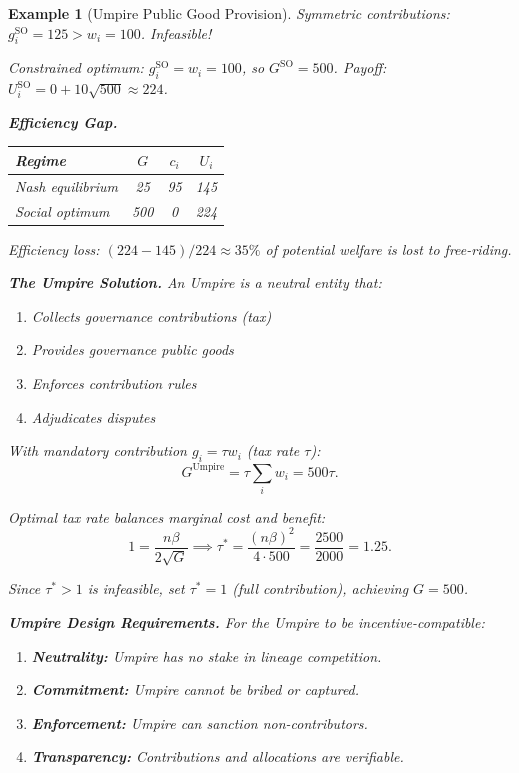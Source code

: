 \documentclass[12pt]{article}
\newtheorem{example}[theorem]{Example}
\begin{document}
\begin{example}[Umpire Public Good Provision]
Symmetric contributions: $g_i^{\text{SO}} = 125 > w_i = 100$. Infeasible!

Constrained optimum: $g_i^{\text{SO}} = w_i = 100$, so $G^{\text{SO}} = 500$.
Payoff: $U_i^{\text{SO}} = 0 + 10\sqrt{500} \approx 224$.

\textbf{Efficiency Gap.}
\begin{center}
\begin{tabular}{lccc}
\toprule
\textbf{Regime} & $G$ & $c_i$ & $U_i$ \\
\midrule
Nash equilibrium & 25 & 95 & 145 \\
Social optimum & 500 & 0 & 224 \\
\bottomrule
\end{tabular}
\end{center}

Efficiency loss: $(224 - 145)/224 \approx 35\%$ of potential welfare is lost to free-riding.

\textbf{The Umpire Solution.}
An \emph{Umpire} is a neutral entity that:
\begin{enumerate}
    \item Collects governance contributions (tax)
    \item Provides governance public goods
    \item Enforces contribution rules
    \item Adjudicates disputes
\end{enumerate}

With mandatory contribution $g_i = \tau w_i$ (tax rate $\tau$):
\[
G^{\text{Umpire}} = \tau \sum_i w_i = 500\tau.
\]

Optimal tax rate balances marginal cost and benefit:
\[
1 = \frac{n\beta}{2\sqrt{G}} \implies \tau^* = \frac{(n\beta)^2}{4 \cdot 500} = \frac{2500}{2000} = 1.25.
\]

Since $\tau^* > 1$ is infeasible, set $\tau^* = 1$ (full contribution), achieving $G = 500$.

\textbf{Umpire Design Requirements.}
For the Umpire to be incentive-compatible:
\begin{enumerate}
    \item \textbf{Neutrality:} Umpire has no stake in lineage competition.
    \item \textbf{Commitment:} Umpire cannot be bribed or captured.
    \item \textbf{Enforcement:} Umpire can sanction non-contributors.
    \item \textbf{Transparency:} Contributions and allocations are verifiable.
\end{enumerate}


\end{example}
\end{document}
